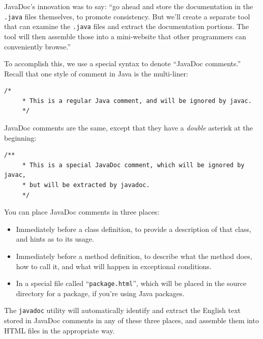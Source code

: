 JavaDoc's innovation was to say: ``go ahead and store the documentation in the
\texttt{.java} files themselves, to promote consistency. But we'll create a
separate tool that can examine the \texttt{.java} files and extract the
documentation portions. The tool will then assemble those into a mini-website
that other programmers can conveniently browse.''

To accomplish this, we use a special syntax to denote ``JavaDoc comments.''
Recall that one style of comment in Java is the multi-liner:

\vspace{-.2in}
\begin{Verbatim}[fontsize=\footnotesize,samepage=true,frame=none]
    /*
     * This is a regular Java comment, and will be ignored by javac.
     */
\end{Verbatim}

JavaDoc comments are the same, except that they have a \textit{double}
asterisk at the beginning:

\begin{Verbatim}[fontsize=\footnotesize,samepage=true,frame=none]
    /**
     * This is a special JavaDoc comment, which will be ignored by javac,
     * but will be extracted by javadoc.
     */
\end{Verbatim}

You can place JavaDoc comments in three places:

\begin{itemize}
\itemsep.1em

\item Immediately before a class definition, to provide a description of that
class, and hints as to its usage.

\item Immediately before a method definition, to describe what the method
does, how to call it, and what will happen in exceptional conditions.

\item In a special file called ``\texttt{package.html}'', which will be placed
in the source directory for a package, if you're using Java packages.

\end{itemize}

The \texttt{javadoc} utility will automatically identify and extract the
English text stored in JavaDoc comments in any of these three places, and
assemble them into HTML files in the appropriate way.

